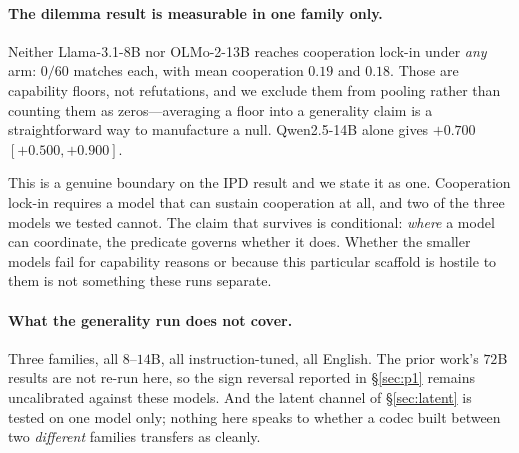 \paragraph{The dilemma result is measurable in one family only.}
Neither Llama-3.1-8B nor OLMo-2-13B reaches cooperation lock-in under \emph{any} arm:
$0/60$ matches each, with mean cooperation $0.19$ and $0.18$. Those are capability
floors, not refutations, and we exclude them from pooling rather than counting them as
zeros---averaging a floor into a generality claim is a straightforward way to
manufacture a null. Qwen2.5-14B alone gives $+0.700$ $[+0.500,+0.900]$.

This is a genuine boundary on the IPD result and we state it as one. Cooperation
lock-in requires a model that can sustain cooperation at all, and two of the three
models we tested cannot. The claim that survives is conditional: \emph{where} a model
can coordinate, the predicate governs whether it does. Whether the smaller models fail
for capability reasons or because this particular scaffold is hostile to them is not
something these runs separate.

\paragraph{What the generality run does not cover.}
Three families, all $8$--$14$B, all instruction-tuned, all English. The prior work's
$72$B results are not re-run here, so the sign reversal reported in \S\ref{sec:p1}
remains uncalibrated against these models. And the latent channel of
\S\ref{sec:latent} is tested on one model only; nothing here speaks to whether a codec
built between two \emph{different} families transfers as cleanly.

